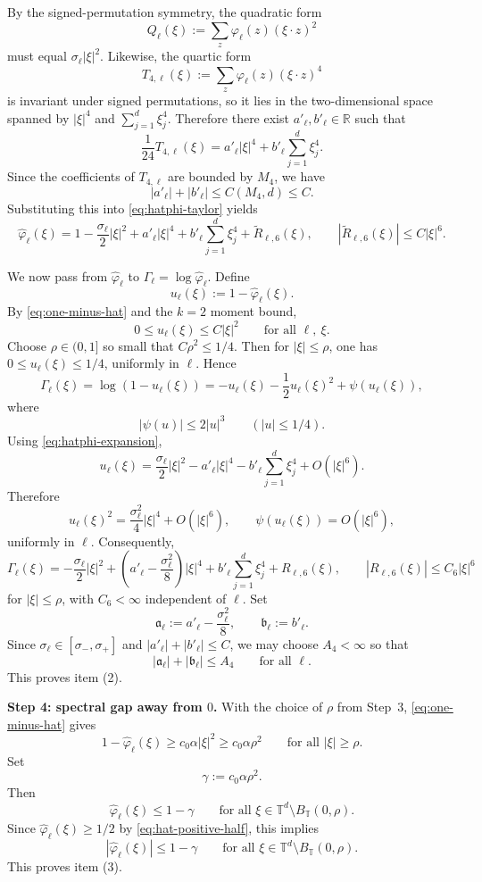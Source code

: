 \documentclass[letterpaper,11pt,reqno]{amsart}
\theoremstyle{definition}
\begin{document}
By the signed-permutation symmetry, the quadratic form
\[
Q_\ell(\xi):=\sum_z\varphi_\ell(z)(\xi\cdot z)^2
\]
must equal \(\sigma_\ell|\xi|^2\). Likewise, the quartic form
\[
T_{4,\ell}(\xi):=\sum_z\varphi_\ell(z)(\xi\cdot z)^4
\]
is invariant under signed permutations, so it lies in the two-dimensional space spanned by
\(|\xi|^4\) and \(\sum_{j=1}^d\xi_j^4\). Therefore there exist \(a'_\ell,b'_\ell\in\mathbb R\) such that
\[
\frac1{24}T_{4,\ell}(\xi)=a'_\ell|\xi|^4+b'_\ell\sum_{j=1}^d\xi_j^4.
\]
Since the coefficients of \(T_{4,\ell}\) are bounded by \(M_4\), we have
\[
|a'_\ell|+|b'_\ell|\le C(M_4,d)\le C.
\]
Substituting this into \eqref{eq:hatphi-taylor} yields
\begin{equation}\label{eq:hatphi-expansion}
\widehat\varphi_\ell(\xi)
=
1-\frac{\sigma_\ell}{2}|\xi|^2
+a'_\ell|\xi|^4
+b'_\ell\sum_{j=1}^d\xi_j^4
+\widetilde R_{\ell,6}(\xi),
\qquad
|\widetilde R_{\ell,6}(\xi)|\le C|\xi|^6.
\end{equation}

We now pass from \(\widehat\varphi_\ell\) to \(\Gamma_\ell=\log\widehat\varphi_\ell\). Define
\[
u_\ell(\xi):=1-\widehat\varphi_\ell(\xi).
\]
By \eqref{eq:one-minus-hat} and the \(k=2\) moment bound,
\[
0\le u_\ell(\xi)\le C|\xi|^2
\qquad\text{for all }\ell,\ \xi.
\]
Choose \(\rho\in(0,1]\) so small that
$C\rho^2\le 1/4$.
Then for \(|\xi|\le \rho\), one has \(0\le u_\ell(\xi)\le1/4\), uniformly in \(\ell\). Hence
\[
\Gamma_\ell(\xi)=\log(1-u_\ell(\xi))
=
-u_\ell(\xi)-\frac12u_\ell(\xi)^2+\psi(u_\ell(\xi)),
\]
where
\[
|\psi(u)|\le 2|u|^3
\qquad (|u|\le1/4).
\]
Using \eqref{eq:hatphi-expansion},
\[
u_\ell(\xi)
=
\frac{\sigma_\ell}{2}|\xi|^2
-a'_\ell|\xi|^4
-b'_\ell\sum_{j=1}^d\xi_j^4
+O(|\xi|^6).
\]
Therefore
\[
u_\ell(\xi)^2
=
\frac{\sigma_\ell^2}{4}|\xi|^4+O(|\xi|^6),
\qquad
\psi(u_\ell(\xi))=O(|\xi|^6),
\]
uniformly in \(\ell\). Consequently,
\[
\Gamma_\ell(\xi)
=
-\frac{\sigma_\ell}{2}|\xi|^2
+
\left(a'_\ell-\frac{\sigma_\ell^2}{8}\right)|\xi|^4
+
b'_\ell\sum_{j=1}^d\xi_j^4
+
R_{\ell,6}(\xi),
\qquad
|R_{\ell,6}(\xi)|\le C_6|\xi|^6
\]
for \(|\xi|\le\rho\), with \(C_6<\infty\) independent of \(\ell\). Set
\[
\mathfrak a_\ell:=a'_\ell-\frac{\sigma_\ell^2}{8},
\qquad
\mathfrak b_\ell:=b'_\ell.
\]
Since \(\sigma_\ell\in[\sigma_-,\sigma_+]\) and \(|a'_\ell|+|b'_\ell|\le C\), we may choose \(A_4<\infty\) so that
\[
|\mathfrak a_\ell|+|\mathfrak b_\ell|\le A_4
\qquad\text{for all }\ell.
\]
This proves item (2).


\smallskip
\noindent\textbf{Step 4: spectral gap away from \(0\).}
With the choice of \(\rho\) from Step~3, \eqref{eq:one-minus-hat} gives
\[
1-\widehat\varphi_\ell(\xi)\ge c_0\alpha|\xi|^2\ge c_0\alpha\rho^2
\qquad\text{for all }|\xi|\ge \rho.
\]
Set
\[
\gamma:=c_0\alpha\rho^2.
\]
Then
\[
\widehat\varphi_\ell(\xi)\le 1-\gamma
\qquad\text{for all }\xi\in\mathbb T^d\setminus B_{\mathbb T}(0,\rho).
\]
Since \(\widehat\varphi_\ell(\xi)\ge1/2\) by \eqref{eq:hat-positive-half}, this implies
\[
|\widehat\varphi_\ell(\xi)|\le 1-\gamma
\qquad\text{for all }\xi\in\mathbb T^d\setminus B_{\mathbb T}(0,\rho).
\]
This proves item (3).
\end{document}
